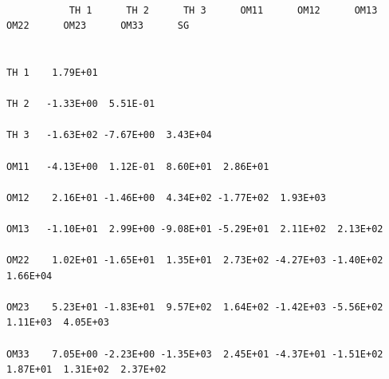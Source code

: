 \documentclass[
  10pt,
]{krantz}
\begin{document}
\begin{verbatim}
                                                                                                       
           TH 1      TH 2      TH 3      OM11      OM12      OM13      OM22      OM23      OM33      SG
                                                                                                       
                                                                                                       
TH 1    1.79E+01                                                                                       
                                                                                                       
TH 2   -1.33E+00  5.51E-01                                                                             
                                                                                                       
TH 3   -1.63E+02 -7.67E+00  3.43E+04                                                                   
                                                                                                       
OM11   -4.13E+00  1.12E-01  8.60E+01  2.86E+01                                                         
                                                                                                       
OM12    2.16E+01 -1.46E+00  4.34E+02 -1.77E+02  1.93E+03                                               
                                                                                                       
OM13   -1.10E+01  2.99E+00 -9.08E+01 -5.29E+01  2.11E+02  2.13E+02                                     
                                                                                                       
OM22    1.02E+01 -1.65E+01  1.35E+01  2.73E+02 -4.27E+03 -1.40E+02  1.66E+04                           
                                                                                                       
OM23    5.23E+01 -1.83E+01  9.57E+02  1.64E+02 -1.42E+03 -5.56E+02  1.11E+03  4.05E+03                 
                                                                                                       
OM33    7.05E+00 -2.23E+00 -1.35E+03  2.45E+01 -4.37E+01 -1.51E+02  1.87E+01  1.31E+02  2.37E+02       
                                                                                                       

\end{verbatim}
\end{document}
